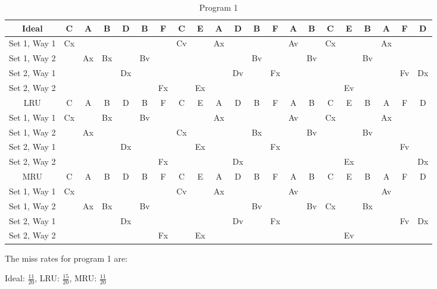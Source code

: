 \documentclass[a4paper, 11pt]{exam}
\begin{document}
\begin{enumerate}
\begin{table}[H]
\caption{Program 1}
\begin{center}
\tiny
\begin{tabular}{|c|c|c|c|c|c|c|c|c|c|c|c|c|c|c|c|c|c|c|c|c|}
\hline
Ideal & C & A & B & D & B & F & C & E & A & D & B & F & A & B & C & E & B & A & F & D \\
\hline
Set 1, Way 1 & Cx &  &  &  &  &  & Cv &  & Ax &  &  &  & Av &  & Cx &  &  & Ax  & & \\
Set 1, Way 2 &  & Ax & Bx &  & Bv &  &  &  &  &  & Bv &  &  & Bv &  &  & Bv & & & \\
\hline
Set 2, Way 1 &  &  &  & Dx &  &  &  &  &  & Dv &  & Fx &  &  &  &  &  &  & Fv & Dx \\
Set 2, Way 2 &  &  &  &  &  & Fx &  & Ex &  &  &  &  &  &  &  & Ev & &  &  &\\
\hline
\hline
LRU & C & A & B & D & B & F & C & E & A & D & B & F & A & B & C & E & B & A & F & D \\
\hline
Set 1, Way 1 & Cx &  & Bx &  & Bv &  &  &  & Ax &  &  &  & Av &  & Cx &  &  & Ax& & \\
Set 1, Way 2 &  & Ax &  &  &  &  & Cx &  &  &  & Bx &  &  & Bv &  &  & Bv & & & \\
\hline
Set 2, Way 1 &  &  &  & Dx &  &  &  & Ex &  &  &  & Fx &  &  &  &  &  &  & Fv &\\
Set 2, Way 2 &  &  &  &  &  & Fx &  &  &  & Dx &  &  &  &  &  & Ex &  &  &  & Dx \\
\hline
\hline
MRU & C & A & B & D & B & F & C & E & A & D & B & F & A & B & C & E & B & A & F & D \\
\hline
Set 1, Way 1 & Cx &  &  &  &  &  & Cv &  & Ax &  &  &  & Av &  &  &  &  & Av & &  \\
Set 1, Way 2 &  & Ax & Bx &  & Bv &  &  &  &  &  & Bv &  &  & Bv & Cx &  & Bx & & &  \\
\hline
Set 2, Way 1 &  &  &  & Dx &  &  &  &  &  & Dv &  & Fx &  &  &  &  &  &  & Fv & Dx \\
Set 2, Way 2 &  &  &  &  &  & Fx &  & Ex &  &  &  &  &  &  &  & Ev  & & & & \\
\hline
\end{tabular}
\end{center}
\label{default}
\end{table}%
The miss rates for program 1 are:

Ideal: $\frac{11}{20}$, LRU: $\frac{15}{20}$, MRU: $\frac{11}{20}$


\end{enumerate}
\end{document}
